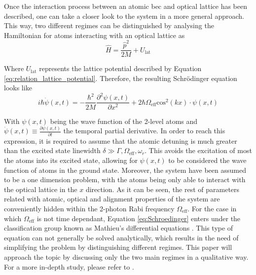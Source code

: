 Once the interaction process between an atomic \ac{bec} and optical lattice has been described, one can take a closer look to the system in a more general approach. This way, two different regimes can be distinguished by analysing the Hamiltonian for atoms interacting with an optical lattice as \cite{Mueller2008}
\begin{equation}
	\hat{H}= \frac{\hat{p}^2}{2M} + U_\text{lat}
\end{equation}

Where $U_\text{lat}$ represents the lattice potential described by Equation \eqref{eq:relation_lattice_potential}. Therefore, the resulting Schr\"odinger equation looks like
\begin{equation}\label{eq:Schroedinger}
	i\hbar \dot\psi(x,t) = -\frac{\hbar^2}{2M}\frac{\partial^2 \psi(x,t)}{\partial x^2} + 2\hbar \Omega_\text{eff} \text{cos}^2(kx)\cdot\psi(x,t)
\end{equation}

With $\psi(x,t)$ being the wave function of the 2-level atoms and $\dot\psi(x,t) \equiv \frac{\partial \psi(x,t)}{\partial t}$ the temporal partial derivative. In order to reach this expression, it is required to assume that the atomic detuning is much greater than the excited state linewidth $\delta \gg \Gamma, \Omega_\text{eff}, \omega_r$. This avoids the excitation of most the atoms into its excited state, allowing for $\psi(x,t)$ to be considered the wave function of atoms in the ground state. Moreover, the system have been assumed to be a one dimension problem, with the atoms being only able to interact with the optical lattice in the $x$ direction. As it can be seen, the rest of parameters related with atomic, optical and alignment properties of the system are conveniently hidden within the 2-photon Rabi frequency $\Omega_\text{eff}$. For the case in which $\Omega_\text{eff}$ is not time dependant, Equation \eqref{eq:Schroedinger} enters under the classification group known as Mathieu's differential equations \cite{Mathieu1868}. This type of equation can not generally be solved analytically, which results in the need of simplifying the problem by distinguishing different regimes. This paper will approach the topic by discussing only the two main regimes in a qualitative way. For a more in-depth study, please refer to \cite{Mueller2008, Meystre2001, Ovchinnikov1999, Kadau2011,Keller1999}.


